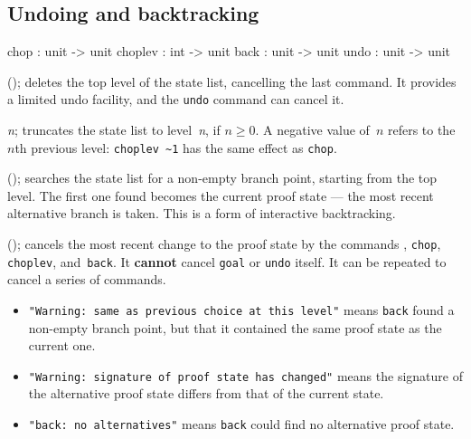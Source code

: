 \subsection{Undoing and backtracking}
\begin{ttbox} 
chop    : unit -> unit
choplev : int -> unit
back    : unit -> unit
undo    : unit -> unit
\end{ttbox}
\begin{ttdescription}
\item[\ttindexbold{chop}();] 
deletes the top level of the state list, cancelling the last 
command.  It provides a limited undo facility, and the \texttt{undo} command
can cancel it.

\item[\ttindexbold{choplev} {\it n};] 
truncates the state list to level~{\it n}, if $n\geq0$.  A negative value
of~$n$ refers to the $n$th previous level: 
\hbox{\verb|choplev ~1|} has the same effect as \texttt{chop}.

\item[\ttindexbold{back}();]
searches the state list for a non-empty branch point, starting from the top
level.  The first one found becomes the current proof state --- the most
recent alternative branch is taken.  This is a form of interactive
backtracking.

\item[\ttindexbold{undo}();] 
cancels the most recent change to the proof state by the commands ,
\texttt{chop}, \texttt{choplev}, and~\texttt{back}.  It {\bf cannot}
cancel \texttt{goal} or \texttt{undo} itself.  It can be repeated to
cancel a series of commands.
\end{ttdescription}

\goodbreak
{}\par\nobreak
\begin{itemize}
\item{\footnotesize\tt"Warning:\ same as previous choice at this level"}
  means \texttt{back} found a non-empty branch point, but that it contained
  the same proof state as the current one.
\item{\footnotesize\tt "Warning:\ signature of proof state has changed"}
  means the signature of the alternative proof state differs from that of
  the current state.
\item {\footnotesize\tt "back:\ no alternatives"} means \texttt{back} could
  find no alternative proof state.
\end{itemize}

